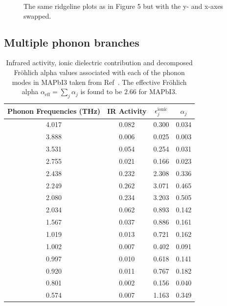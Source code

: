 \begin{figure}
{\begin{subfigure}[b]{.58\textwidth}
\end{subfigure}%
}
\caption{The same ridgeline plots as in Figure 5 but with the y- and x-axes swapped. }
\end{figure}

\subsection{Multiple phonon branches}

\begin{table}
\begin{center}
\begin{tabular}{||c|c|c|c||} 
\hline\hline
Phonon Frequencies (THz) & IR Activity & $\epsilon^{\text{ionic}}_j$ & $\alpha_j$ \\
\hline\hline
4.017 & 0.082 & 0.300 & 0.034 \\
\hline
3.888 & 0.006 & 0.025 & 0.003 \\
\hline
3.531 & 0.054 & 0.254 & 0.031 \\ 
\hline
2.755 & 0.021 & 0.166 & 0.023 \\
\hline
2.438 & 0.232 & 2.308 & 0.336 \\
\hline
2.249 & 0.262 & 3.071 & 0.465 \\
\hline
2.080 & 0.234 & 3.203 & 0.505 \\
\hline
2.034 & 0.062 & 0.893 & 0.142 \\
\hline
1.567 & 0.037 & 0.886 & 0.161 \\
\hline
1.019 & 0.013 & 0.721 & 0.162 \\
\hline
1.002 & 0.007 & 0.402 & 0.091 \\
\hline
0.997 & 0.010 & 0.618 & 0.141 \\
\hline
0.920 & 0.011 & 0.767 & 0.182 \\
\hline
0.801 & 0.002 & 0.156 & 0.040 \\
\hline
0.574 & 0.007 & 1.163 & 0.349 \\
\hline\hline
\end{tabular} \label{table:mapidata}
\caption{Infrared activity, ionic dielectric contribution and decomposed Fr\"ohlich alpha values associated with each of the phonon modes in MAPbI3 taken from Ref~\cite{brivio_lattice_2015}. The effective Fr\"ohlich alpha $\alpha_{\text{eff}} = \sum_j \alpha_j$ is found to be $2.66$ for MAPbI3.}
\end{center}
\end{table}

